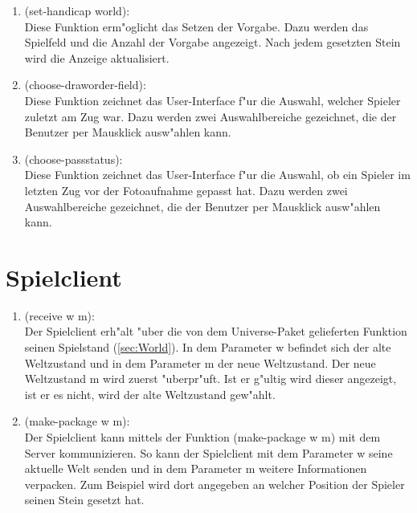 \documentclass[a4paper]{scrreprt}
\begin{document}
\begin{enumerate}
\item (set-handicap world):\\
Diese Funktion erm"oglicht das Setzen der Vorgabe. Dazu werden das Spielfeld und die Anzahl der Vorgabe angezeigt. Nach jedem gesetzten Stein wird die Anzeige aktualisiert.

\item (choose-draworder-field):\\
Diese Funktion zeichnet das User-Interface f"ur die Auswahl, welcher Spieler zuletzt am Zug war. Dazu werden zwei Auswahlbereiche gezeichnet, die der Benutzer per Mausklick ausw"ahlen kann.

\item (choose-passstatus):\\
Diese Funktion zeichnet das User-Interface f"ur die Auswahl, ob ein Spieler im letzten Zug vor der Fotoaufnahme gepasst hat. Dazu werden zwei Auswahlbereiche gezeichnet, die der Benutzer per Mausklick ausw"ahlen kann.
\end{enumerate}

\section{Spielclient}

\begin{enumerate}
\item (receive w m):\\
Der Spielclient erh"alt "uber die von dem Universe-Paket gelieferten Funktion seinen Spielstand (\ref{sec:World}). In dem Parameter w befindet sich der alte Weltzustand und in dem Parameter m der neue Weltzustand. Der neue Weltzustand m wird zuerst "uberpr"uft. Ist er g"ultig wird dieser angezeigt, ist er es nicht, wird der alte Weltzustand gew"ahlt.

\item (make-package w m):\\
Der Spielclient kann mittels der Funktion (make-package w m) mit dem Server kommunizieren. So kann der Spielclient mit dem Parameter w seine aktuelle Welt senden und in dem Parameter m weitere Informationen verpacken. Zum Beispiel wird dort angegeben an welcher Position der Spieler seinen Stein gesetzt hat.

\end{enumerate}
\end{document}
